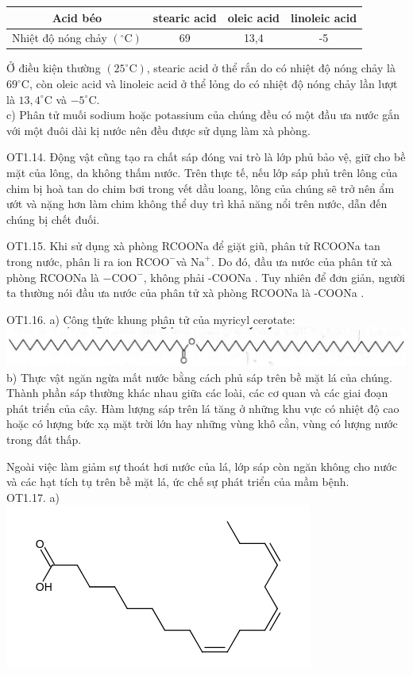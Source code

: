 \documentclass[10pt]{article}
\begin{document}
\begin{center}
\begin{tabular}{|c|c|c|c|}
\hline
Acid béo & stearic acid & oleic acid & linoleic acid \\
\hline
Nhiệt độ nóng chảy $\left({ }^{\circ} \mathrm{C}\right)$ & 69 & 13,4 & -5 \\
\hline
\end{tabular}
\end{center}

Ở điều kiện thường $\left(25^{\circ} \mathrm{C}\right)$, stearic acid ở thể rắn do có nhiệt độ nóng chảy là $69^{\circ} \mathrm{C}$, còn oleic acid và linoleic acid ở thể lỏng do có nhiệt độ nóng chảy lần lượt là $13,4^{\circ} \mathrm{C}$ và $-5^{\circ} \mathrm{C}$.\\
c) Phân tử muối sodium hoặc potassium của chúng đều có một đầu ưa nước gắn với một đuôi dài kị nước nên đều được sử dụng làm xà phòng.

OT1.14. Động vật cũng tạo ra chất sáp đóng vai trò là lớp phủ bảo vệ, giữ cho bề mặt của lông, da không thấm nước. Trên thực tế, nếu lớp sáp phủ trên lông của chim bị hoà tan do chim bơi trong vết dầu loang, lông của chúng sẽ trở nên ẩm ướt và nặng hơn làm chim không thể duy trì khả năng nổi trên nước, dẫn đến chúng bị chết đuối.

OT1.15. Khi sử dụng xà phòng RCOONa để giặt giũ, phân tử RCOONa tan trong nước, phân li ra ion $\mathrm{RCOO}^{-}$và $\mathrm{Na}^{+}$. Do đó, đầu ưa nước của phân tử xà phòng RCOONa là $-\mathrm{COO}^{-}$, không phải -COONa . Tuy nhiên để đơn giản, người ta thường nói đầu ưa nước của phân tử xà phòng RCOONa là -COONa .

OT1.16. a) Công thức khung phân tử của myricyl cerotate:\\
\includegraphics[max width=\textwidth, center]{2025_10_23_b4e16b74380d0f7e7700g-018}\\
b) Thực vật ngăn ngừa mất nước bằng cách phủ sáp trên bề mặt lá của chúng. Thành phần sáp thường khác nhau giữa các loài, các cơ quan và các giai đoạn phát triển của cây. Hàm lượng sáp trên lá tăng ở những khu vực có nhiệt độ cao hoặc có lượng bức xạ mặt trời lớn hay những vùng khô cằn, vùng có lượng nước trong đất thấp.

Ngoài việc làm giảm sự thoát hơi nước của lá, lớp sáp còn ngăn không cho nước và các hạt tích tụ trên bề mặt lá, ức chế sự phát triển của mầm bệnh.\\
OT1.17. a)\\
\includegraphics{smile-a4eac796d7dcd321079e4a4133957cc7d5106d67}
\end{document}
